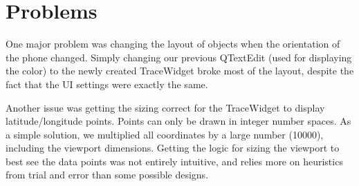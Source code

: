 \documentclass[12pt]{article}
\begin{document}
\section{Problems}
One major problem was changing the layout of objects when the orientation of the
phone changed.  Simply changing our previous QTextEdit (used for displaying the
color) to the newly created TraceWidget broke most of the layout, despite the
fact that the UI settings were exactly the same.

Another issue was getting the sizing correct for the TraceWidget to display
latitude/longitude points.  Points can only be drawn in integer number spaces.
As a simple solution, we multiplied all coordinates by a large number (10000),
including the viewport dimensions.  Getting the logic for sizing the viewport to
best see the data points was not entirely intuitive, and relies more on
heuristics from trial and error than some possible designs.
\end{document}
